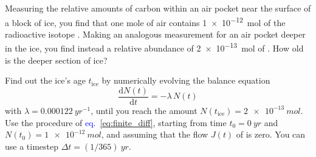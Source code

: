 \documentclass[a4paper,12pt,%
onecolumn,oneside,titlepage,%
british%
]{memoir}
\newcommand*{\di}{\mathrm{d}}%
\newcommand*{\incr}{\Delta}%
\renewcommand*{\|}[1][]{\nonscript\:#1\vert\nonscript\:\mathopen{}}
\newcommand*{\sect}{\S}%
\newcommand*{\eqn}{eq.}%
\renewcommand*{\autoref}[2]{\sidepar{\vspace{-1ex}\footnotesize{\color{blue}\faIcon{%
angle-right%
}\enspace\sect\,\ref{#1} page\,\pageref{#1}}}\textcolor{blue}{#2}}
\newcommand*{\yti}{t_{0}}
\newcommand*{\Dt}{\incr t}
\newcommand*{\yN}{N}
\newcommand*{\yJ}{J}
\begin{document}
%
%
\begin{exercise}
  Measuring the relative amounts of carbon within an air pocket near the surface of a block of ice, you find that one mole of air contains \qty[print-unity-mantissa=false]{1e-12}{mol} of the radioactive isotope . Making an analogous measurement for an air pocket deeper in the ice, you find instead a relative abundance of \qty{2e-13}{mol} of . How old is the deeper section of ice?

  Find out the ice's age $t_{\text{ice}}$ by numerically evolving the balance equation
  $$\frac{\di\yN(t)}{\di t} = -\lambda\,\yN(t)$$
  with $\lambda=\qty{0.000122}{yr^{-1}}$, until you reach the amount $\yN(t_{\text{ice}})= \qty{2e-13}{mol}$.
  Use the procedure of \autoref{sec:numeric_simulation}{\eqn~\eqref{eq:finite_diff}}, starting from time $\yti=\qty{0}{yr}$ and $\yN(\yti)=\qty[print-unity-mantissa=false]{1e-12}{mol}$, and assuming that the flow $\yJ(t)$ of  is zero. You can use a timestep $\Dt = (1/365)\:\unit{yr}$.
\end{exercise}
\end{document}
